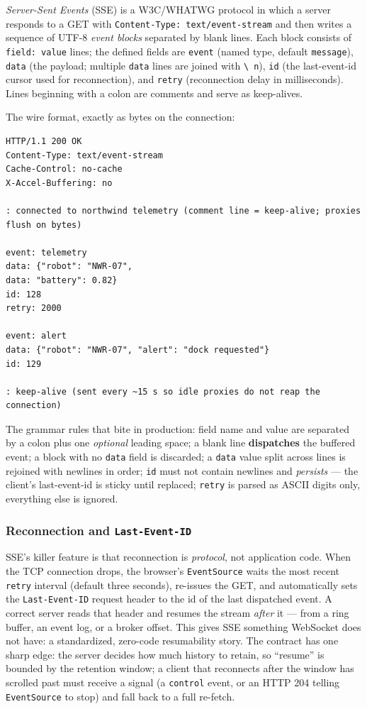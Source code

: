 \begin{definition}
\emph{Server-Sent Events} (SSE) is a W3C/WHATWG protocol in which a server
responds to a GET with \texttt{Content-Type: text/event-stream} and then
writes a sequence of UTF-8 \emph{event blocks} separated by blank lines. Each
block consists of \texttt{field: value} lines; the defined fields are
\texttt{event} (named type, default \texttt{message}), \texttt{data} (the
payload; multiple \texttt{data} lines are joined with \texttt{\textbackslash
n}), \texttt{id} (the last-event-id cursor used for reconnection), and
\texttt{retry} (reconnection delay in milliseconds). Lines beginning with a
colon are comments and serve as keep-alives.
\end{definition}

The wire format, exactly as bytes on the connection:

\begin{verbatim}
HTTP/1.1 200 OK
Content-Type: text/event-stream
Cache-Control: no-cache
X-Accel-Buffering: no

: connected to northwind telemetry (comment line = keep-alive; proxies flush on bytes)

event: telemetry
data: {"robot": "NWR-07",
data: "battery": 0.82}
id: 128
retry: 2000

event: alert
data: {"robot": "NWR-07", "alert": "dock requested"}
id: 129

: keep-alive (sent every ~15 s so idle proxies do not reap the connection)
\end{verbatim}

The grammar rules that bite in production: field name and value are separated
by a colon plus one \emph{optional} leading space; a blank line
\textbf{dispatches} the buffered event; a block with no \texttt{data} field
is discarded; a \texttt{data} value split across lines is rejoined with
newlines in order; \texttt{id} must not contain newlines and \emph{persists}
--- the client's last-event-id is sticky until replaced; \texttt{retry} is
parsed as ASCII digits only, everything else is ignored.

\subsubsection{Reconnection and \texttt{Last-Event-ID}}

SSE's killer feature is that reconnection is \emph{protocol}, not
application code. When the TCP connection drops, the browser's
\texttt{EventSource} waits the most recent \texttt{retry} interval (default
three seconds), re-issues the GET, and automatically sets the
\texttt{Last-Event-ID} request header to the id of the last dispatched event.
A correct server reads that header and resumes the stream \emph{after} it ---
from a ring buffer, an event log, or a broker offset. This gives SSE
something WebSocket does not have: a standardized, zero-code resumability
story. The contract has one sharp edge: the server decides how much history
to retain, so ``resume'' is bounded by the retention window; a client that
reconnects after the window has scrolled past must receive a signal (a
\texttt{control} event, or an HTTP 204 telling \texttt{EventSource} to stop)
and fall back to a full re-fetch.

